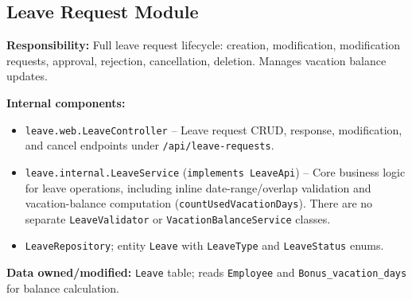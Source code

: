 \documentclass[11pt,a4paper]{article}
\begin{document}
\subsection{Leave Request Module}

\textbf{Responsibility:} Full leave request lifecycle: creation, modification, modification requests, approval, rejection, cancellation, deletion. Manages vacation balance updates.

\textbf{Internal components:}
\begin{itemize}[leftmargin=1.5em]
    \item \texttt{leave.web.LeaveController} -- Leave request CRUD, response, modification, and cancel endpoints under \texttt{/api/leave-requests}.
    \item \texttt{leave.internal.LeaveService} (\texttt{implements LeaveApi}) -- Core business logic for leave operations, including inline date-range/overlap validation and vacation-balance computation (\texttt{countUsedVacationDays}). There are no separate \texttt{LeaveValidator} or \texttt{VacationBalanceService} classes.
    \item \texttt{LeaveRepository}; entity \texttt{Leave} with \texttt{LeaveType} and \texttt{LeaveStatus} enums.
\end{itemize}

\textbf{Data owned/modified:} \texttt{Leave} table; reads \texttt{Employee} and \texttt{Bonus\_vacation\_days} for balance calculation.
\end{document}
